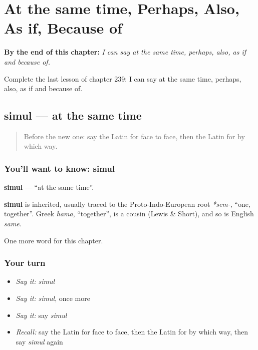 
\chapter{At the same time, Perhaps, Also, As if, Because of}
\label{ch:la-at-the-same-time-perhaps-also-as-if-because-of}

\begin{chapteropening}
\textbf{By the end of this chapter:} \emph{I can say at the same time, perhaps, also, as if and because of.}

Complete the last lesson of chapter 239: I can say at the same time, perhaps, also, as if and because of.
\end{chapteropening}

\section[simul]{simul — at the same time}

\label{lesson:LA-C239-simul}



\begin{quote}
Before the new one: say the Latin for face to face, then the Latin for by which way.
\end{quote}

\subsection*{You'll want to know: simul}
\textbf{simul} — \textquotedblleft{}at the same time\textquotedblright{}.

\begin{cousinweb}
\textbf{simul} is inherited, usually traced to the Proto-Indo-European root \emph{*sem-}, \textquotedblleft{}one, together\textquotedblright{}. Greek \emph{hama}, \textquotedblleft{}together\textquotedblright{}, is a cousin (Lewis \& Short), and so is English \emph{same}.
\end{cousinweb}

\begin{grammarlens}[title={What you've built}]
One more word for this chapter.
\end{grammarlens}

\subsection*{Your turn}
\begin{itemize}
\raggedright
  \item \emph{Say it:} \emph{simul}
  \item \emph{Say it:} \emph{simul}, once more
  \item \emph{Say it:} say \emph{simul}
  \item \emph{Recall:} say the Latin for face to face, then the Latin for by which way, then say \emph{simul} again
\end{itemize}


